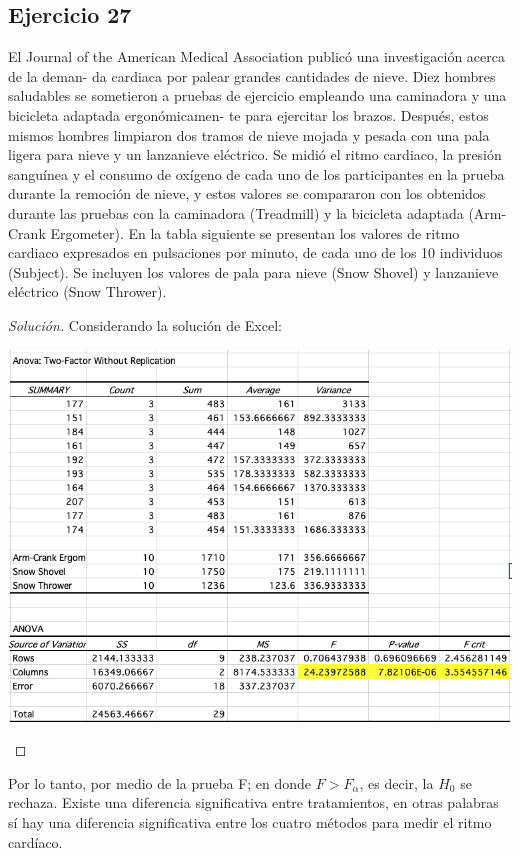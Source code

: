 \documentclass[a4paper,12pt]{article}
\newenvironment{solution}
  {\renewcommand\qedsymbol{$\blacksquare$}\begin{proof}[Solución]}
  {\end{proof}}
\begin{document}
\subsection{Ejercicio 27}
El Journal of the American Medical Association publicó una investigación acerca de la deman- da cardiaca por palear grandes cantidades de nieve. Diez hombres saludables se sometieron a pruebas de ejercicio empleando una caminadora y una bicicleta adaptada ergonómicamen- te para ejercitar los brazos. Después, estos mismos hombres limpiaron dos tramos de nieve mojada y pesada con una pala ligera para nieve y un lanzanieve eléctrico. Se midió el ritmo cardiaco, la presión sanguínea y el consumo de oxígeno de cada uno de los participantes en la prueba durante la remoción de nieve, y estos valores se compararon con los obtenidos durante las pruebas con la caminadora (Treadmill) y la bicicleta adaptada (Arm-Crank Ergometer). En la tabla siguiente se presentan los valores de ritmo cardiaco expresados en pulsaciones por minuto, de cada uno de los 10 individuos (Subject). Se incluyen los valores de pala para nieve (Snow Shovel) y lanzanieve eléctrico (Snow Thrower).
\begin{solution}
Considerando la solución de Excel: 
\begin{center}
    \includegraphics[scale=0.5]{Imagenes/27.png}
\end{center}
\end{solution}

Por lo tanto, por medio de la prueba F; en donde $F>F_\alpha$, es decir, la $H_0$ se rechaza. Existe una diferencia significativa entre tratamientos, en otras palabras sí hay una diferencia significativa entre los cuatro métodos para medir el ritmo cardíaco.
\end{document}
